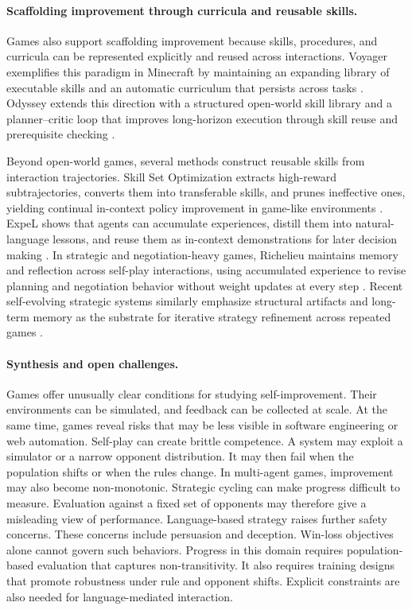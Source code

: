 \documentclass{article}
\begin{document}
\paragraph{Scaffolding improvement through curricula and reusable skills.}
Games also support scaffolding improvement because skills, procedures, and curricula can be represented explicitly and reused across interactions. Voyager exemplifies this paradigm in Minecraft by maintaining an expanding library of executable skills and an automatic curriculum that persists across tasks \citep{wang2023voyageropenendedembodiedagent}. Odyssey extends this direction with a structured open-world skill library and a planner--critic loop that improves long-horizon execution through skill reuse and prerequisite checking \citep{liu2025odysseyempoweringminecraftagents}.

Beyond open-world games, several methods construct reusable skills from interaction trajectories. Skill Set Optimization extracts high-reward subtrajectories, converts them into transferable skills, and prunes ineffective ones, yielding continual in-context policy improvement in game-like environments \citep{nottingham2024skillsetoptimizationreinforcing}. ExpeL shows that agents can accumulate experiences, distill them into natural-language lessons, and reuse them as in-context demonstrations for later decision making \citep{zhao2024expel}. In strategic and negotiation-heavy games, Richelieu maintains memory and reflection across self-play interactions, using accumulated experience to revise planning and negotiation behavior without weight updates at every step \citep{guan2024richelieu}. Recent self-evolving strategic systems similarly emphasize structural artifacts and long-term memory as the substrate for iterative strategy refinement across repeated games \citep{belle2025agentschangeselfevolvingllm}.


\paragraph{Synthesis and open challenges.}
Games offer unusually clear conditions for studying self-improvement. Their environments can be simulated, and feedback can be collected at scale. At the same time, games reveal risks that may be less visible in software engineering or web automation. Self-play can create brittle competence. A system may exploit a simulator or a narrow opponent distribution. It may then fail when the population shifts or when the rules change. In multi-agent games, improvement may also become non-monotonic. Strategic cycling can make progress difficult to measure. Evaluation against a fixed set of opponents may therefore give a misleading view of performance. Language-based strategy raises further safety concerns. These concerns include persuasion and deception. Win-loss objectives alone cannot govern such behaviors. Progress in this domain requires population-based evaluation that captures non-transitivity. It also requires training designs that promote robustness under rule and opponent shifts. Explicit constraints are also needed for language-mediated interaction.
\end{document}
